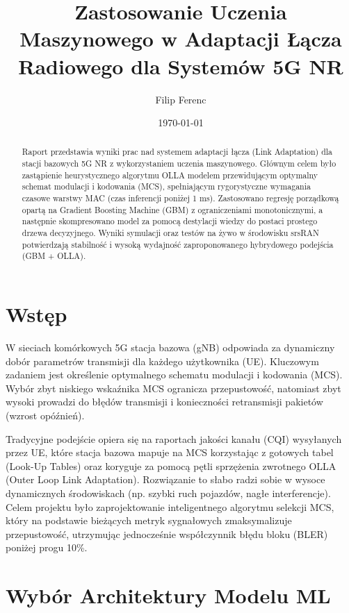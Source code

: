 \documentclass[11pt,a4paper]{article}
\title{\textbf{Zastosowanie Uczenia Maszynowego w Adaptacji Łącza Radiowego dla Systemów 5G NR}}
\author{Filip Ferenc}
\date{\today}
\begin{document}
\maketitle

\begin{abstract}
Raport przedstawia wyniki prac nad systemem adaptacji łącza (Link Adaptation) dla stacji bazowych 5G NR z wykorzystaniem uczenia maszynowego. Głównym celem było zastąpienie heurystycznego algorytmu OLLA modelem przewidującym optymalny schemat modulacji i kodowania (MCS), spełniającym rygorystyczne wymagania czasowe warstwy MAC (czas inferencji poniżej 1 ms). Zastosowano regresję porządkową opartą na Gradient Boosting Machine (GBM) z ograniczeniami monotonicznymi, a następnie skompresowano model za pomocą destylacji wiedzy do postaci prostego drzewa decyzyjnego. Wyniki symulacji oraz testów na żywo w środowisku srsRAN potwierdzają stabilność i wysoką wydajność zaproponowanego hybrydowego podejścia (GBM + OLLA).
\end{abstract}

\section{Wstęp}

W sieciach komórkowych 5G stacja bazowa (gNB) odpowiada za dynamiczny dobór parametrów transmisji dla każdego użytkownika (UE). Kluczowym zadaniem jest określenie optymalnego schematu modulacji i kodowania (MCS). Wybór zbyt niskiego wskaźnika MCS ogranicza przepustowość, natomiast zbyt wysoki prowadzi do błędów transmisji i konieczności retransmisji pakietów (wzrost opóźnień). 

Tradycyjne podejście opiera się na raportach jakości kanału (CQI) wysyłanych przez UE, które stacja bazowa mapuje na MCS korzystając z gotowych tabel (Look-Up Tables) oraz koryguje za pomocą pętli sprzężenia zwrotnego OLLA (Outer Loop Link Adaptation). Rozwiązanie to słabo radzi sobie w wysoce dynamicznych środowiskach (np. szybki ruch pojazdów, nagłe interferencje). Celem projektu było zaprojektowanie inteligentnego algorytmu selekcji MCS, który na podstawie bieżących metryk sygnałowych zmaksymalizuje przepustowość, utrzymując jednocześnie współczynnik błędu bloku (BLER) poniżej progu 10\%.

\section{Wybór Architektury Modelu ML}
\end{document}
